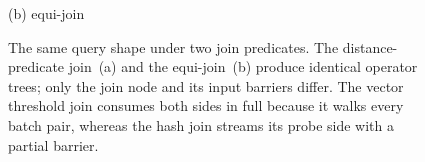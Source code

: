 \begin{figure}[t]
\begin{minipage}[t]{0.48\textwidth}
{\small (b) equi-join}
\end{minipage}
\caption{The same query shape under two join predicates. The distance-predicate
join~(a) and the equi-join~(b) produce identical operator trees; only the join
node and its input barriers differ. The vector threshold join consumes both
sides in full because it walks every batch pair, whereas the hash join streams
its probe side with a partial barrier.}
\label{fig:native-plans}
\end{figure}
